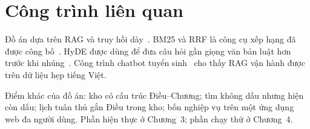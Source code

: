 \section{Công trình liên quan}

Đồ án dựa trên RAG và truy hồi dày~\cite{lewis2020rag, karpukhin2020dpr}. BM25
và RRF là công cụ xếp hạng đã được công bố~\cite{robertson2009bm25, cormack2009rrf}.
HyDE được dùng để đưa câu hỏi gần giọng văn bản luật hơn trước khi
nhúng~\cite{gao2023hyde}. Công trình chatbot tuyển sinh~\cite{duong2026} cho
thấy RAG vận hành được trên dữ liệu hẹp tiếng Việt.

Điểm khác của đồ án: kho có cấu trúc Điều--Chương; tìm không dấu nhưng hiện còn
dấu; lịch tuân thủ gắn Điều trong kho; bốn nghiệp vụ trên một ứng dụng web đa
người dùng. Phần hiện thực ở Chương~3; phần chạy thử ở Chương~4.
